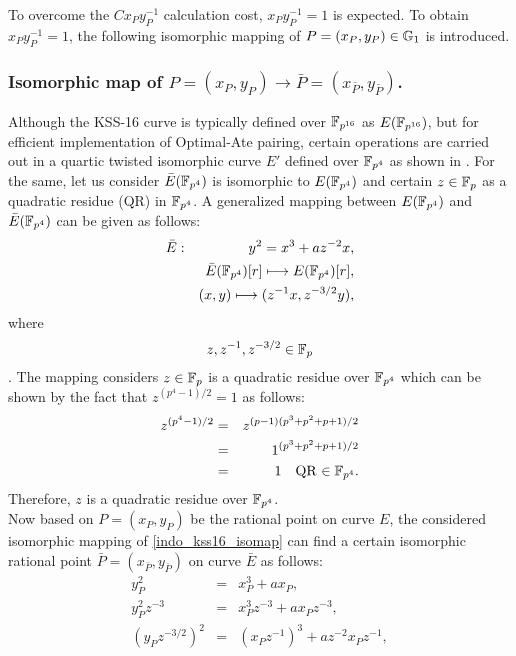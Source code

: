 To overcome the $Cx_{P}y_{P}^{-1}$  calculation cost, $x_{P}y_{P}^{-1} =1 $ is expected. 
To obtain $x_{P}y_{P}^{-1} = 1$, the following isomorphic mapping of $P=(x_P,y_P) \in {\mathbb{G}}_{1}$ is introduced. 


\subsubsection{Isomorphic map of \texorpdfstring{$P=(x_P,y_P) \to \bar P=(x_{\bar P},y_{\bar P})$}{}.}
Although the KSS-16 curve is typically defined over $\mathbb{F}_{p^{16}}$ as $E(\mathbb{F}_{p^{16}})$, but for efficient implementation of Optimal-Ate pairing, certain operations are carried out in a quartic twisted isomorphic curve $E'$ defined over $\mathbb{F}_{p^4}$ as shown in . 
For the same, let us consider $\bar{E}(\mathbb{F}_{p^4})$ is isomorphic to $E(\mathbb{F}_{p^4})$ and certain $z \in {\mathbb{F}}_{p}$ as a quadratic residue (QR) in $\mathbb{F}_{p^4}$. 
A generalized mapping between $E(\mathbb{F}_{p^4})$ and $\bar{E}(\mathbb{F}_{p^4})$ can be given as follows:
\begin{eqnarray}
	\bar{E}&:&y^2=x^3+az^{-2}x,\nonumber\\
	&&\bar{E}(\mathbb{F}_{p^4})[r]\longmapsto E(\mathbb{F}_{p^4})[r],\nonumber\\
	&&(x,y)\longmapsto (z^{-1}x,z^{-3/2}y),\label{indo_kss16_isomap}\nonumber\\
\end{eqnarray}
	 where $$z, z^{-1},z^{-3/2}\in {\mathbb{F}}_{p}$$.
The mapping considers $z \in {\mathbb{F}}_{p}$ is a quadratic residue over $\mathbb{F}_{p^4}$ which can be shown by the fact that $z^{(p^4-1)/2} = 1$ as follows:
\begin{eqnarray}
 z^{(p^4-1)/2}& = &z^{(p-1)(p^3+p^2+p+1)/2 } \nonumber \\
& = &1^{(p^3+p^2+p+1)/2 } \nonumber \\
& = & 1 \quad \text{QR $\in \mathbb{F}_{p^4}$}.
\end{eqnarray}
Therefore, $z$ is a quadratic residue over $\mathbb{F}_{p^4}$.\\
Now  based on $P= (x_P, y_P)$ be the rational point on curve $E$, the considered isomorphic mapping of \eqref{indo_kss16_isomap}  can find a certain isomorphic rational point $\bar P = (x_{\bar P}, y_{\bar P})$ on curve $\bar E$ as follows:
\begin{eqnarray}\label{eq:indo_kss16_bar_P}
y_P^2 & = & x_P^3+ax_P, \nonumber \\
y_P^2 z^{-3}& = & x_P^3 z^{-3} +ax_Pz^{-3}, \nonumber \\
(y_P z^{-3/2})^2& = & (x_Pz^{-1})^3 +az^{-2} x_Pz^{-1},
\end{eqnarray}
